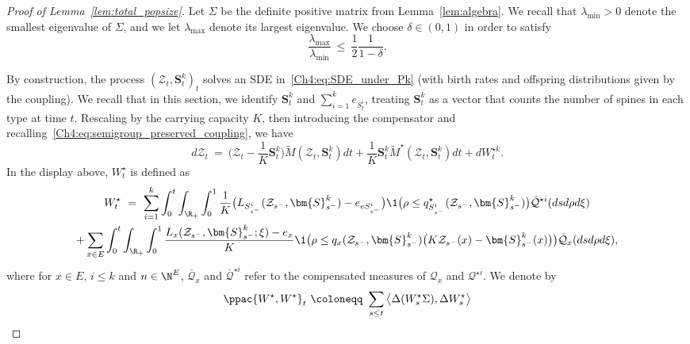 \begin{refsegment}
\begin{proof}[Proof of Lemma~\ref{lem:total_popsize}]
Let $\Sigma$ be the definite positive matrix from Lemma~\ref{lem:algebra}. We recall that $\lambda_{\min}>0$ denote the smallest eigenvalue of $\Sigma$, and we let $\lambda_{\max}$ denote its largest eigenvalue. We choose $\delta\in (0,1)$ in order to satisfy
\begin{equation}\label{Ch4:eq:choice_delta}
\frac{\lambda_{\max}}{\lambda_{\min}}\ \leq\ \frac{1}{2}\frac{1}{1-\delta}.
\end{equation}

By construction, the process $(\mathcal Z
_t, \bm S^k_t)_t$ solves an SDE in~\eqref{Ch4:eq:SDE_under_Pk} (with birth rates and offspring distributions given by the coupling).
We recall that in this section, we identify
$\bm S^k_t$ and $\sum_{i=1}^k e_{S^i_t}$, treating $\bm S^k_t$ as a vector that counts the number of spines in each type at time $t$.
Rescaling by the carrying capacity $K$, then introducing the compensator and recalling~\eqref{Ch4:eq:semigroup_preserved_coupling}, we have
\[
 d\mathcal Z_t\ =\ \big( \mathcal Z_t-\frac{1}{K}{\bm S}^k_t\big)\widetilde M(\mathcal Z_t, {\bm S}^k_t)dt +  \frac{1}{K}{\bm S}^k_t \widetilde M^\star(\mathcal Z_t,{\bm S}^k_t)dt + d {W}^{\star k}_t.
  \]
In the display above, $W^\star_t$ is defined as
\begin{multline*}
W^\star_t \ =\  
    \sum_{i=1}^k \int_0^t \int_{\R_+}\int_0^1  
    \frac{1}{K}\big({L}_{{S}^i_{s^-}}({\mathcal{Z}}_{s^-}, {\bm{S}}^k_{s^-}) - e_{e{S}^i_{s^-}}\big) \1\big(\rho\leq {q}^\star_{{S}^i_{s^-}}({\mathcal{Z}}_{s^-}, {\bm{S}}^k_{s^-})\big)
    \bar{\mathcal{Q}}^{\star i}(ds d\rho d\xi)
 \\
+ \sum_{x \in E} \int_0^t \int_{\R_+}\int_0^1 
\frac{{L}_x({\mathcal{Z}}_{s^-}, {\bm{S}}^k_{s^-}; \xi) - e_x}{K}
 \1\big(\rho \leq {q}_{x}({\mathcal{Z}}_{s^-},{\bm{S}}^k_{s^-})\big(K {\mathcal{Z}}_{s^-}(x) - {\bm{S}}^k_{s^-}(x) \big)\big)
 \bar{\mathcal{Q}}_x(ds d\rho d\xi),
\end{multline*}
where for $x\in E$, $i\leq k$ and $n\in\N^E$, $\bar{\mathcal{Q}}_{x}$ and $\bar{\mathcal{Q}}^{\star i}$ refer to the compensated measures of $\mathcal{Q}_x$ and $\mathcal{Q}^{\star i}$.
We denote by
\begin{equation}\label{Ch4:eq:W^star_crochet}
\ppac{W^\star, W^\star}_t\ \coloneqq\ \sum_{s\leq t }\big\langle\Delta( W^\star_s\Sigma), \Delta W^\star_s\big\rangle

\end{equation}
\end{proof}
\end{refsegment}

